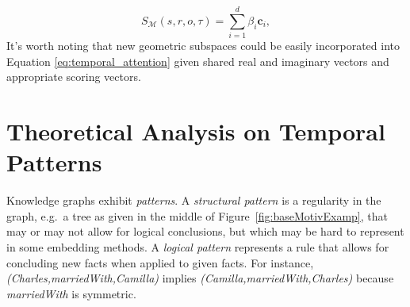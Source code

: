 \documentclass[letterpaper]{article} %
\begin{document}


\begin{equation}
S_{\mathcal{M}}(s,r,o, \tau) = \sum_{i=1}^{d}\beta_i \boldsymbol{c}_i,
    \label{eq:temporal_attention}
\end{equation}
It's worth noting that new geometric subspaces could be easily incorporated into Equation \ref{eq:temporal_attention} given shared real and imaginary vectors and appropriate scoring vectors.


\section{Theoretical Analysis on Temporal Patterns}
\label{sec:temporal_patterns}
Knowledge graphs exhibit \emph{patterns}.
A \emph{structural pattern} is a regularity in the graph, e.g.\ a tree as given in the middle of Figure~\ref{fig:baseMotivExamp}, that may or may not allow for logical conclusions, but which may be hard to represent in some embedding methods.
A \emph{logical pattern} represents a rule that allows for concluding new facts when applied to given facts. For instance, \textit{(Charles,marriedWith,Camilla)} implies
 \textit{(Camilla,marriedWith,Charles)} because \textit{marriedWith} is symmetric.
\end{document}

